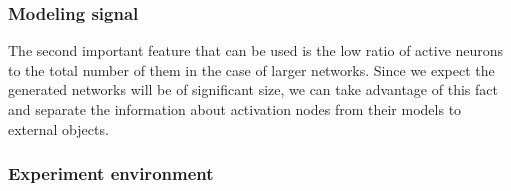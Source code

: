 \documentclass{beamer}
\begin{document}
\begin{frame}
\frametitle{Modeling signal}
The second important feature that can be used is the low ratio of active neurons to
the total number of them in the case of larger networks.
Since we expect the generated networks will be of significant size, we can take advantage of this
fact and separate the information about activation nodes from their models to external objects. 
\end{frame}

\begin{frame}
\frametitle{Experiment environment}
\end{frame}
\end{document}
